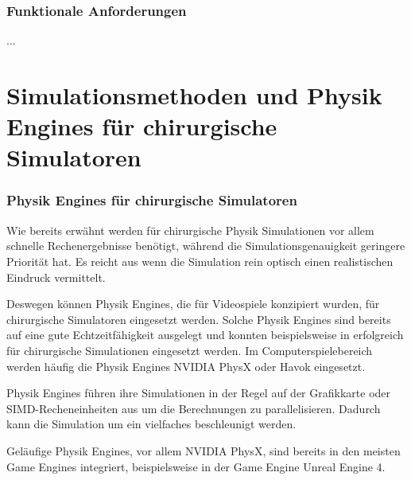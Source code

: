 \subsubsection{Funktionale Anforderungen}
...

\section{Simulationsmethoden und Physik Engines für chirurgische Simulatoren}

\subsubsection{Physik Engines für chirurgische Simulatoren}

Wie bereits erwähnt werden für chirurgische Physik Simulationen vor allem schnelle Rechenergebnisse benötigt, während die Simulationsgenauigkeit geringere Priorität hat. Es reicht aus wenn die Simulation rein optisch einen realistischen Eindruck vermittelt.


Deswegen können Physik Engines, die für Videospiele konzipiert wurden, für chirurgische Simulatoren eingesetzt werden. Solche Physik Engines sind bereits auf eine gute Echtzeitfähigkeit ausgelegt und konnten beispielsweise in \cite{SimUpdate} erfolgreich für chirurgische Simulationen eingesetzt werden. 
Im Computerspielebereich werden häufig die Physik Engines NVIDIA PhysX oder Havok eingesetzt. 

Physik Engines führen ihre Simulationen in der Regel auf der Grafikkarte oder SIMD-Recheneinheiten aus um die Berechnungen zu parallelisieren. Dadurch kann die Simulation um ein vielfaches beschleunigt werden.

Geläufige Physik Engines, vor allem NVIDIA PhysX, sind bereits in den meisten Game Engines integriert, beispielsweise in der Game Engine Unreal Engine 4. 

